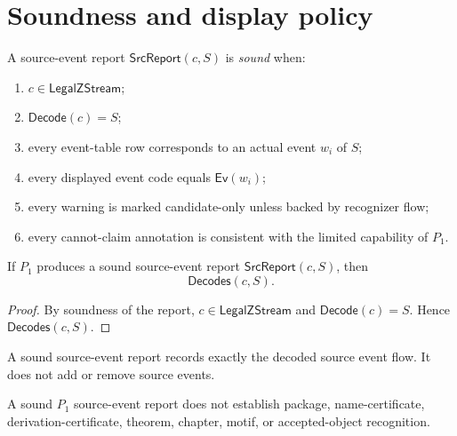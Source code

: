 \section{Soundness and display policy}
\label{sec:source-report-soundness-display}

\begin{definition}
\label{def:source-report-sound}
A source-event report $\mathsf{SrcReport}(c,S)$ is \emph{sound} when:
\begin{enumerate}
\item $c\in\mathsf{LegalZStream}$;
\item $\mathsf{Decode}(c)=S$;
\item every event-table row corresponds to an actual event $w_i$ of $S$;
\item every displayed event code equals $\mathsf{Ev}(w_i)$;
\item every warning is marked candidate-only unless backed by recognizer flow;
\item every cannot-claim annotation is consistent with the limited capability of $P_1$.
\end{enumerate}
\end{definition}

\begin{theorem}
\label{thm:source-report-sound-report}
If $P_1$ produces a sound source-event report $\mathsf{SrcReport}(c,S)$, then
$$
  \mathsf{Decodes}(c,S).
$$
\end{theorem}

\begin{proof}
By soundness of the report, $c\in\mathsf{LegalZStream}$ and $\mathsf{Decode}(c)=S$. Hence $\mathsf{Decodes}(c,S)$.
\end{proof}

\begin{corollary}
\label{cor:source-report-preserves-raw-flow}
A sound source-event report records exactly the decoded source event flow. It does not add or remove source events.
\end{corollary}

\begin{theorem}
\label{thm:source-report-does-not-recognize-structures}
A sound $P_1$ source-event report does not establish package, name-certificate, derivation-certificate, theorem, chapter, motif, or accepted-object recognition.
\end{theorem}

